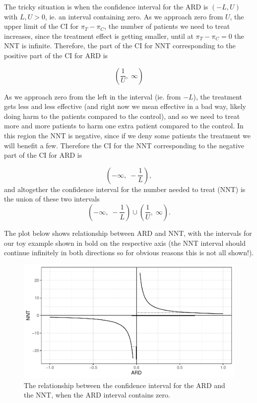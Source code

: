 \documentclass[
  openany]{book}
\theoremstyle{definition}
\theoremstyle{definition}
\theoremstyle{definition}
\theoremstyle{definition}
\theoremstyle{remark}
\begin{document}
The tricky situation is when the confidence interval for the ARD is \(\left(-L, U\right)\) with \(L,U>0\), ie. an interval containing zero. As we approach zero from \(U\), the upper limit of the CI for \(\pi_T - \pi_C\), the number of patients we need to treat increases, since the treatment effect is getting smaller, until at \(\pi_T - \pi_C=0\) the NNT is infinite. Therefore, the part of the CI for NNT corresponding to the positive part of the CI for ARD is

\[\left(\frac{1}{U},\; \infty\right)\]

As we approach zero from the left in the interval (ie. from \(-L\)), the treatment gets less and less effective (and right now we mean effective in a bad way, likely doing harm to the patients compared to the control), and so we need to treat more and more patients to harm one extra patient compared to the control. In this region the NNT is negative, since if we deny some patients the treatment we will benefit a few. Therefore the CI for the NNT corresponding to the negative part of the CI for ARD is

\[\left(-\infty,\;-\frac{1}{L}\right), \]
and altogether the confidence interval for the number needed to treat (NNT) is the union of these two intervals
\[\left(-\infty,\;-\frac{1}{L}\right) \cup \left(\frac{1}{U},\; \infty\right).\]

The plot below shows relationship between ARD and NNT, with the intervals for our toy example shown in bold on the respective axis (the NNT interval should continue infinitely in both directions so for obvious reasons this is not all shown!).

\begin{figure}
\centering
\includegraphics{CT4H_notes_files/figure-latex/unnamed-chunk-28-1.pdf}
\caption{\label{fig:unnamed-chunk-28}The relationship between the confidence interval for the ARD and the NNT, when the ARD interval contains zero.}
\end{figure}
\end{document}
